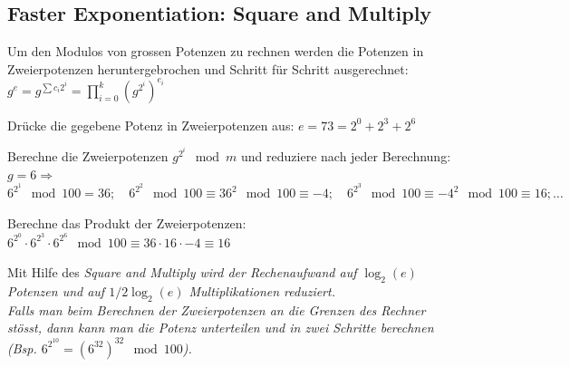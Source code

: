\subsection{Faster Exponentiation: Square and Multiply}
Um den Modulos von grossen Potenzen zu rechnen werden die Potenzen in Zweierpotenzen heruntergebrochen und Schritt für Schritt ausgerechnet:\\
$g^e=g^{\sum c_i 2^i}=\prod_{i=0}^k \left(g^{2^i}\right)^{e_i}$
\begin{aufzaehlung}
\item Drücke die gegebene Potenz in Zweierpotenzen aus: $e=73=2^0+2^3+2^6$
\item Berechne die Zweierpotenzen $g^{2^i} \mod m$ und reduziere nach jeder Berechnung: $g=6\Rightarrow$\\ 
$6^{2^1} \mod 100 = 36;\quad 6^{2^2} \mod 100 \equiv 36^2  \mod 100 \equiv -4;\quad  6^{2^3} \mod 100 \equiv {-4}^2 \mod 100 \equiv 16; \ldots$
\item Berechne das Produkt der Zweierpotenzen: $6^{2^0}\cdot6^{2^3}\cdot6^{2^6}\mod 100\equiv 36 \cdot 16 \cdot -4 \equiv 16$
\end{aufzaehlung}
Mit Hilfe des \em Square and Multiply \em wird der Rechenaufwand auf $\log_2(e)$ Potenzen und auf $1/2 \log_2(e)$ Multiplikationen reduziert. \\
Falls man beim Berechnen der Zweierpotenzen an die Grenzen des Rechner stösst, dann kann man die Potenz unterteilen und in zwei Schritte berechnen 
(Bsp. $6^{2^{10}}=(6^{32})^{32} \mod 100$).

